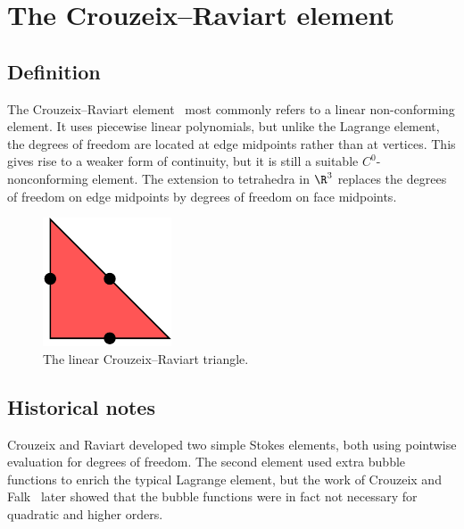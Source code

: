 
\newpage

\section{The Crouzeix--Raviart element}

\subsection{Definition}

The Crouzeix--Raviart element~\cite{CrouzeixRaviart1973} most commonly
refers to a linear non-confor\-ming element. It uses piecewise linear
polynomials, but unlike the Lagrange element, the degrees of freedom
are located at edge midpoints rather than at vertices.  This gives
rise to a weaker form of continuity, but it is still a suitable
$C^0$-nonconforming element. The extension to tetrahedra in $\R^3$
replaces the degrees of freedom on edge midpoints by degrees of
freedom on face midpoints.


\begin{figure}[h]
  \begin{center} \includegraphics[width=\smallfig]{chapters/kirby-6/pdf/CR1.pdf}
    \caption{The linear Crouzeix--Raviart triangle.}  \end{center}
\end{figure}

\subsection{Historical notes}

Crouzeix and Raviart developed two simple Stokes elements, both using
pointwise evaluation for degrees of freedom. The second element used
extra bubble functions to enrich the typical Lagrange element, but the
work of Crouzeix and Falk~\cite{CrouzeixFalk1989} later showed that
the bubble functions were in fact not necessary for quadratic and
higher orders.


